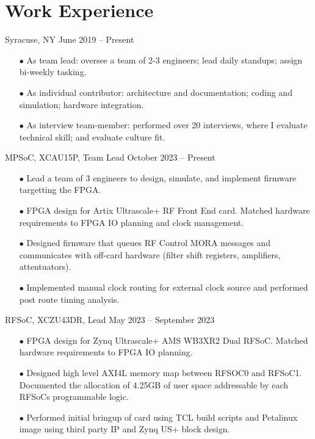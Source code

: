 \documentclass[10pt,final,sans]{resume}
\begin{document}
\vfill

\section{Work Experience}
 { Syracuse, NY } { June 2019 -- Present }
\begin{adjustwidth}{.3cm}{}
\begin{itemize}
  \item[$\bullet$] As team lead: oversee a team of 2-3 engineers; lead daily standups; assign bi-weekly tasking. 
  \item[$\bullet$] As individual contributor: architecture and documentation; coding and simulation; hardware integration. 
  \item[$\bullet$] As interview team-member: performed over 20 interviews, where I evaluate technical skill; and evaluate culture fit. 
\end{itemize}
\end{adjustwidth}

\begin{adjustwidth}{.3cm}{}
   { MPSoC, XCAU15P, Team Lead } { October 2023 -- Present }
  \begin{itemize}
    \item[$\bullet$] Lead a team of 3 engineers to design, simulate, and implement firmware targetting the FPGA.
    \item[$\bullet$] FPGA design for Artix Ultrascale+ RF Front End card. Matched hardware requirements to FPGA IO planning and clock management.
    \item[$\bullet$] Designed firmware that queues RF Control MORA messages and communicates with off-card hardware (filter shift registers, amplifiers, attentuators). 
    \item[$\bullet$] Implemented manual clock routing for external clock source and performed post route timing analysis.
  \end{itemize}
\end{adjustwidth}

\begin{adjustwidth}{.3cm}{}
   { RFSoC, XCZU43DR, Lead } { May 2023 -- September 2023 }
  \begin{itemize}
    \item[$\bullet$] FPGA design for Zynq Ultrascale+ AMS WB3XR2 Dual RFSoC. Matched hardware requirements to FPGA IO planning. 
    \item[$\bullet$] Designed high level AXI4L memory map between RFSOC0 and RFSoC1. Documented the allocation of 4.25GB of user space addressable by each RFSoCs programmable logic.
    \item[$\bullet$] Performed initial bringup of card using TCL build scripts and Petalinux image using third party IP and Zynq US+ block design.
  \end{itemize}
\end{adjustwidth}
\end{document}
